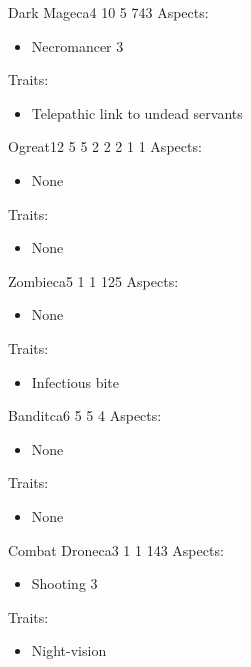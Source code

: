 \documentclass[11pt]{article}
\begin{document}
{\begin{npc}{Dark Mage}{ca}{4 10 5 7}{43}
Aspects:
\begin{itemize}
\item Necromancer 3
\end{itemize}
\columnbreak
Traits:
\begin{itemize}
\item Telepathic link to undead servants
\end{itemize}
\end{npc}

\begin{npc}{Ogre}{at}{12 5 5 2 2 2 1 1}{}
Aspects:
\begin{itemize}
\item None
\end{itemize}
Traits:
\begin{itemize}
\item None
\end{itemize}
\end{npc}

\begin{npc}{Zombie}{ca}{5 1 1 1}{25}
Aspects:
\begin{itemize}
\item None
\end{itemize}
Traits:
\begin{itemize}
\item Infectious bite
\end{itemize}
\end{npc}

\begin{npc}{Bandit}{ca}{6 5 5 4}{}
Aspects:
\begin{itemize}
\item None
\end{itemize}
Traits:
\begin{itemize}
\item None
\end{itemize}
\end{npc}

\begin{npc}{Combat Drone}{ca}{3 1 1 1}{43}
Aspects:
\begin{itemize}
\item Shooting 3
\end{itemize}
Traits:
\begin{itemize}
\item Night-vision
\end{itemize}
\end{npc}

}
\end{document}
